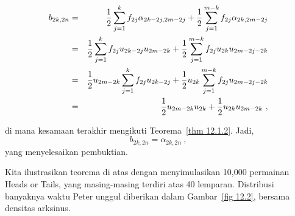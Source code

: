 \begin{theorem}
\begin{eqnarray*}
b_{2k, 2n} &=& {1\over 2} \sum_{j = 1}^k f_{2j}\alpha_{2k-2j, 2m-2j} + 
{1\over 2}\sum_{j = 1}^{m-k} f_{2j}\alpha_{2k, 2m - 2j}\\
&=& {1\over 2}\sum_{j = 1}^k f_{2j}u_{2k-2j}u_{2m-2k} + 
{1\over 2}\sum_{j = 1}^{m-k} f_{2j}u_{2k}u_{2m - 2j - 2k}\\
&=& {1\over 2}u_{2m-2k}\sum_{j = 1}^k f_{2j}u_{2k - 2j} +
{1\over 2}u_{2k}\sum_{j = 1}^{m-k} f_{2j}u_{2m - 2j - 2k}\\
&=& {1\over 2}u_{2m - 2k}u_{2k} + {1\over 2}u_{2k}u_{2m - 2k}\ ,
\end{eqnarray*}

di mana kesamaan terakhir mengikuti Teorema~\ref{thm 12.1.2}. Jadi,
$$b_{2k, 2n} = \alpha_{2k, 2n}\ ,$$
yang menyelesaikan pembuktian.
\end{theorem}
Kita ilustrasikan teorema di atas dengan menyimulasikan 10{,}000 permainan
Heads or Tails, yang masing-masing terdiri atas 40 lemparan. Distribusi
banyaknya waktu Peter unggul diberikan dalam Gambar~\ref{fig 12.2}, bersama
densitas arksinus.


